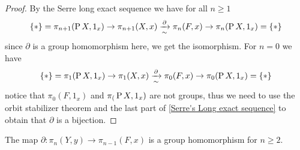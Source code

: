 \begin{proof}
    By the Serre long exact sequence we have for all $n \geq 1$
    \[
    \{*\}=\pi_{n+1}(\operatorname{P} X,1_x) \to \pi_{n+1}(X,x) \xrightarrow[\sim]{\partial} \pi_n(F,x) \to \pi_n(\operatorname{P} X, 1_x)=\{*\}
    \]
    since $\partial$ is a group homomorphism here, we get the isomorphism.
    For $n=0$ we have
    \[
    \{*\}=\pi_{1}(\operatorname{P} X,1_x) \to \pi_{1}(X,x) \xrightarrow[\sim]{\partial} \pi_0(F,x) \to \pi_0(\operatorname{P} X, 1_x)=\{*\}
    \]
    notice that $\pi_0(F,1_x)$ and $\pi_(\operatorname{P} X,1_x)$ are not groups, thus we need to use the orbit stabilizer theorem and the last part of \cref{Serre's Long exact sequence} to obtain that $\partial$ is a bijection.
\end{proof}

\begin{prop}
    The map $\partial\colon \pi_n(Y,y) \to \pi_{n-1}(F,x)$ is a group homomorphism for $n \geq 2$.
\end{prop}

